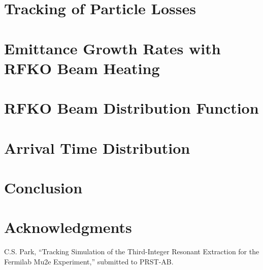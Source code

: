 \documentclass[aps,prstab,onecolumn,preprint,nofootinbib]{revtex4-1}
\begin{document}
\clearpage

\section{\label{sec:loss}Tracking of Particle Losses}

\section{\label{sec:emit}Emittance Growth Rates with RFKO Beam Heating}

\section{\label{sec:rfko}RFKO Beam Distribution Function}

\section{\label{sec:arrival}Arrival Time Distribution}

\section{\label{sec:conclusion}Conclusion}

\section{\label{thanks}Acknowledgments}

\begin{thebibliography}{77}

  C.S. Park, ``Tracking Simulation of the Third-Integer Resonant Extraction for the Fermilab Mu2e Experiment,'' submitted to PRST-AB.

\end{thebibliography}
\end{document}
